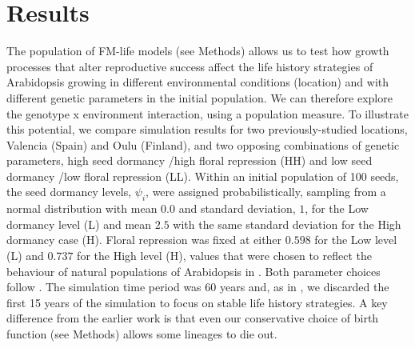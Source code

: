 \section{Results}
\label{sec:results}

The population of FM-life models (see Methods) allows us to test how growth
processes that alter reproductive success affect the life history strategies of
Arabidopsis growing in different environmental conditions (location) and with
different genetic parameters in the initial population. We can therefore explore
the genotype x environment interaction, using a population measure. To
illustrate this potential, we compare simulation results for two
previously-studied locations, Valencia (Spain) and Oulu (Finland), and two
opposing combinations of genetic parameters, high seed dormancy /high floral
repression (HH) and low seed dormancy /low floral repression (LL). Within an
initial population of 100 seeds, the seed dormancy levels, \(\psi_{i}\), were
assigned probabilistically, sampling from a normal distribution with mean
\(0.0\) and standard deviation, \(1\), for the Low dormancy level (L) and mean
\(2.5\) with the same standard deviation for the High dormancy case (H). Floral
repression was fixed at either \(0.598\) for the Low level (L) and \(0.737\) for
the High level (H), values that were chosen to reflect the behaviour of natural
populations of Arabidopsis in \citet{wilczek_effects_2009}. Both parameter
choices follow \citet{burghardt_modeling_2015}. The simulation time period was
60 years and, as in \citet{burghardt_modeling_2015}, we discarded the first 15
years of the simulation to focus on stable life history strategies. A key
difference from the earlier work is that even our conservative choice of birth
function (see Methods) allows some lineages to die out.


